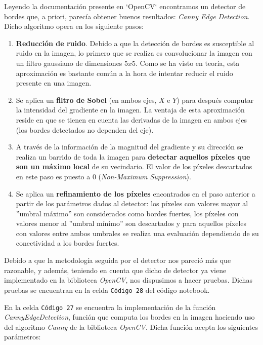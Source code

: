 \documentclass[11pt,twoside,titlepage,a4paper]{article}
\numberwithin{equation}{section} %
\theoremstyle{usual}
\begin{document}
Leyendo la documentación presente en `OpenCV` \cite{canyOpenCV} encontramos un detector de bordes que, a priori, parecía obtener buenos resultados: \textit{Canny Edge Detection}. Dicho algoritmo opera en los siguiente pasos:

\begin{enumerate}
    \item \textbf{Reducción de ruido}. Debido a que la detección de bordes es susceptible al ruido en la imagen, lo primero que se realiza es convolucionar la imagen con un filtro gaussiano de dimensiones $5x5$. Como se ha visto en teoría, esta aproximación es bastante común a la hora de intentar reducir el ruido presente en una imagen.
    \item Se aplica un \textbf{filtro de Sobel} (en ambos ejes, $X$ e $Y$) para después computar la intensidad del gradiente en la imagen. La ventaja de esta aproximación reside en que se tienen en cuenta las derivadas de la imagen en ambos ejes (los bordes detectados no dependen del eje).
    \item A través de la información de la magnitud del gradiente y su dirección se realiza un barrido de toda la imagen para \textbf{detectar aquellos píxeles que son un máximo local} de su vecindario. El valor de los píxeles descartados en este paso es puesto a 0 (\textit{Non-Maximum Suppression}).
    \item Se aplica un \textbf{refinamiento de los píxeles} encontrados en el paso anterior a partir de los parámetros dados al detector: los píxeles con valores mayor al ''umbral máximo'' son considerados como bordes fuertes, los píxeles con valores menor al ''umbral mínimo'' son descartados y para aquellos píxeles con valores entre ambos umbrales se realiza una evaluación dependiendo de su conectividad a los bordes fuertes.
\end{enumerate}

Debido a que la metodología seguida por el detector nos pareció más que razonable, y además, teniendo en cuenta que dicho de detector ya viene implementado en la biblioteca \textit{OpenCV}, nos dispusimos a hacer pruebas. Dichas pruebas se encuentran en la celda \texttt{Código 28} del código notebook.

En la celda \texttt{Código 27} se encuentra la implementación de la función \textit{CannyEdgeDetection}, función que computa los bordes en la imagen haciendo uso del algoritmo \textit{Canny} de la biblioteca \textit{OpenCV}. Dicha función acepta los siguientes parámetros:
\end{document}
